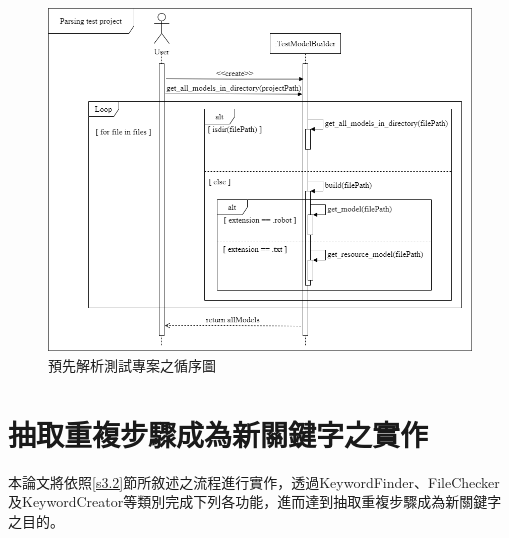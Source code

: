 \begin{figure}[H]
	\centering
    \includegraphics[width=1.0\textwidth]{picture/ch4/sequenceDiagram/Parsing_test_project_sequence_diagram.png}
    \caption{預先解析測試專案之循序圖}
    \label{f4.3}
\end{figure}

\section{抽取重複步驟成為新關鍵字之實作}
本論文將依照\ref{s3.2}節所敘述之流程進行實作，透過KeywordFinder、FileChecker及KeywordCreator等類別完成下列各功能，進而達到抽取重複步驟成為新關鍵字之目的。

